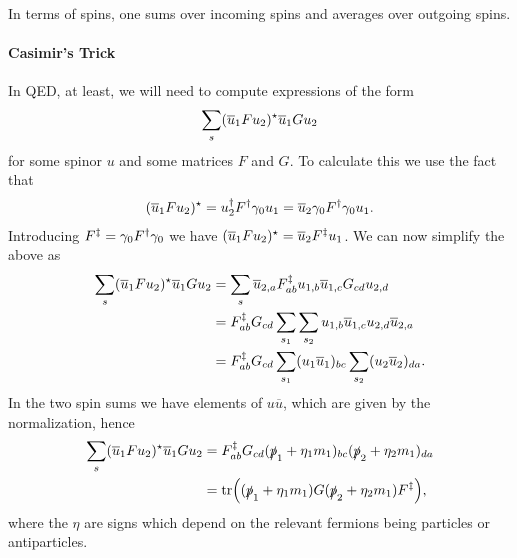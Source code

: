 In terms of spins, one sums over incoming spins and averages over outgoing spins.

\paragraph{Casimir's Trick}
In QED, at least, we will need to compute expressions of the form
\begin{align*}
	\sum\limits_{s}(\overline{u}_{1}Fu_{2})^{\star} \overline{u}_{1}Gu_{2}
\end{align*}
for some spinor $u$ and some matrices $F$ and $G$. To calculate this we use the fact that
\begin{align*}
	(\overline{u}_{1}Fu_{2})^{\star} = u_{2}^{\dagger} F^{\dagger}\gamma_{0}u_{1} = \overline{u}_{2}\gamma_{0}F^{\dagger}\gamma_{0}u_{1}.
\end{align*}
Introducing $F^{\ddagger} = \gamma_{0}F^{\dagger}\gamma_{0}$ we have $(\overline{u}_{1}Fu_{2})^{\star} = \overline{u}_{2}F^{\ddagger}u_{1}$. We can now simplify the above as
\begin{align*}
	\sum\limits_{s}(\overline{u}_{1}Fu_{2})^{\star} \overline{u}_{1}Gu_{2} &= \sum\limits_{s}\overline{u}_{2, a}F^{\ddagger}_{ab}u_{1, b}\overline{u}_{1, c}G_{cd}u_{2, d} \\
	&= F^{\ddagger}_{ab}G_{cd}\sum\limits_{s_{1}}\sum\limits_{s_{2}}u_{1, b}\overline{u}_{1, c}u_{2, d}\overline{u}_{2, a} \\
	&= F^{\ddagger}_{ab}G_{cd}\sum\limits_{s_{1}}(u_{1}\overline{u}_{1})_{bc}\sum\limits_{s_{2}}(u_{2}\overline{u}_{2})_{da}.
\end{align*}
In the two spin sums we have elements of $u\overline{u}$, which are given by the normalization, hence
\begin{align*}
	\sum\limits_{s}(\overline{u}_{1}Fu_{2})^{\star} \overline{u}_{1}Gu_{2} &= F^{\ddagger}_{ab}G_{cd}(\slashed{p}_{1} + \eta_{1}m_{1})_{bc}(\slashed{p}_{2} + \eta_{2}m_{1})_{da} \\
	&= \tr((\slashed{p}_{1} + \eta_{1}m_{1})G(\slashed{p}_{2} + \eta_{2}m_{1})F^{\ddagger}),
\end{align*}
where the $\eta$ are signs which depend on the relevant fermions being particles or antiparticles. 

